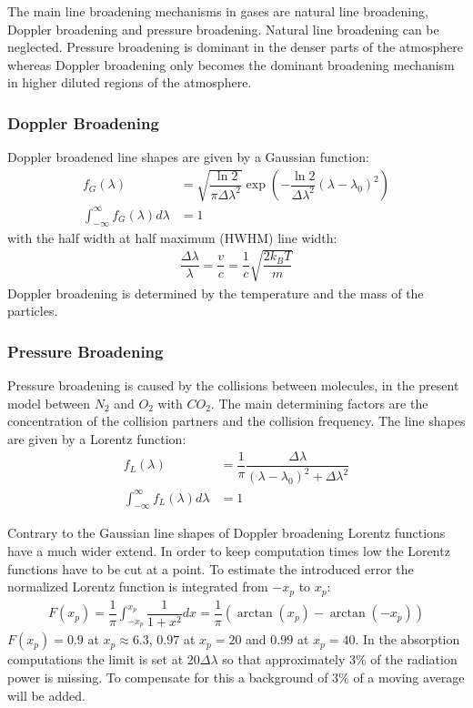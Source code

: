 The main line broadening mechanisms in gases are natural line broadening, Doppler broadening and pressure broadening. Natural line broadening can be neglected. Pressure broadening is dominant in the denser parts of the atmosphere whereas Doppler broadening only becomes the dominant broadening mechanism in higher diluted regions of the atmosphere.

\subsubsection{Doppler Broadening}

Doppler broadened line shapes are given by a Gaussian function:
\begin{align}
	f_G(\lambda) &= \sqrt{\dfrac{\ln 2}{\pi \Delta \lambda^2}}  
		\exp \left(- \dfrac{\ln 2}{\Delta \lambda^2}  \left(\lambda - \lambda_0\right)^2 \right) \\
			\int_{-\infty}^{\infty}  f_G(\lambda) d\lambda &= 1
\end{align}
with the half width at half maximum (HWHM) line width:
\begin{align}
\dfrac{\Delta \lambda}{\lambda} = \dfrac{v}{c} = \dfrac{1}{c} \sqrt{\dfrac{2 k_B T}{m}}
\end{align}
Doppler broadening is  determined by the temperature and the mass of the particles.

\subsubsection{Pressure Broadening}

Pressure broadening is caused by the collisions between molecules, in the present model between $N_2$ and $O_2$ with $CO_2$. 
The main determining factors are the concentration of the collision partners and the collision frequency. The line shapes are given by a Lorentz function:
\begin{align}
	f_L(\lambda) &= \dfrac{1}{\pi} \dfrac{\Delta \lambda}{ (\lambda - \lambda_0)^2 + \Delta \lambda^2} \\
	\int_{-\infty}^{\infty}  f_L(\lambda) d\lambda &= 1
\end{align}

Contrary to the Gaussian line shapes of Doppler broadening Lorentz functions have a much wider extend. In order to keep computation times low the Lorentz functions have to be cut at a point. To estimate the introduced error the normalized Lorentz function is integrated from $-x_p$ to $x_p$:
\begin{align}
	F(x_p) = \dfrac{1}{\pi} \int_{-x_p}^{x_p} \dfrac{1}{1 + x^2} dx = \dfrac{1}{\pi} \left(\arctan(x_p) - \arctan(-x_p)\right)
\end{align}
$F(x_p) = 0.9$ at $x_p \approx 6.3$, $0.97$ at $x_p = 20$ and $0.99$ at $x_p = 40$. In the absorption computations the limit is set at  $20 \Delta \lambda$ so that approximately 3\% of the radiation power is missing. To compensate for this a background of 3\% of a moving average will be added.


